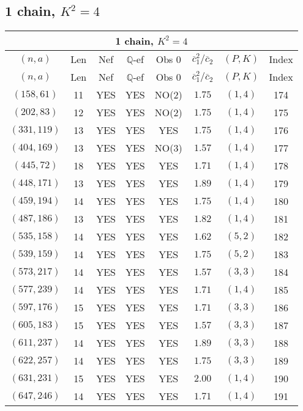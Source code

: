 \subsection{1 chain, $K^2 = 4$}
\begin{longtable}{|c|c|c|c|c|c|c|c|}
\hline
\multicolumn{8}{|c|}{1 chain, $K^2 = 4$}\\
\hline
$(n,a)$ & Len & Nef & $\mathbb Q$-ef & Obs 0 & $\overline c_1^2 / \overline c_2$ & $(P,K)$ & Index\\
\hline
\endfirsthead

\hline
$(n,a)$ & Len & Nef & $\mathbb Q$-ef & Obs 0 & $\overline c_1^2 / \overline c_2$ & $(P,K)$ & Index\\
\hline
\endhead
\hline
\endfoot

$(158,61)$ & 11 & YES & YES & NO(2) & $1.75$ & $(1,4)$ & 174\\
$(202,83)$ & 12 & YES & YES & NO(2) & $1.75$ & $(1,4)$ & 175\\
$(331,119)$ & 13 & YES & YES & YES & $1.75$ & $(1,4)$ & 176\\
$(404,169)$ & 13 & YES & YES & NO(3) & $1.57$ & $(1,4)$ & 177\\
$(445,72)$ & 18 & YES & YES & YES & $1.71$ & $(1,4)$ & 178\\
$(448,171)$ & 13 & YES & YES & YES & $1.89$ & $(1,4)$ & 179\\
$(459,194)$ & 14 & YES & YES & YES & $1.75$ & $(1,4)$ & 180\\
$(487,186)$ & 13 & YES & YES & YES & $1.82$ & $(1,4)$ & 181\\
$(535,158)$ & 14 & YES & YES & YES & $1.62$ & $(5,2)$ & 182\\
$(539,159)$ & 14 & YES & YES & YES & $1.75$ & $(5,2)$ & 183\\
$(573,217)$ & 14 & YES & YES & YES & $1.57$ & $(3,3)$ & 184\\
$(577,239)$ & 14 & YES & YES & YES & $1.71$ & $(1,4)$ & 185\\
$(597,176)$ & 15 & YES & YES & YES & $1.71$ & $(3,3)$ & 186\\
$(605,183)$ & 15 & YES & YES & YES & $1.57$ & $(3,3)$ & 187\\
$(611,237)$ & 14 & YES & YES & YES & $1.89$ & $(3,3)$ & 188\\
$(622,257)$ & 14 & YES & YES & YES & $1.75$ & $(3,3)$ & 189\\
$(631,231)$ & 15 & YES & YES & YES & $2.00$ & $(1,4)$ & 190\\
$(647,246)$ & 14 & YES & YES & YES & $1.71$ & $(1,4)$ & 191\\

\end{longtable}
